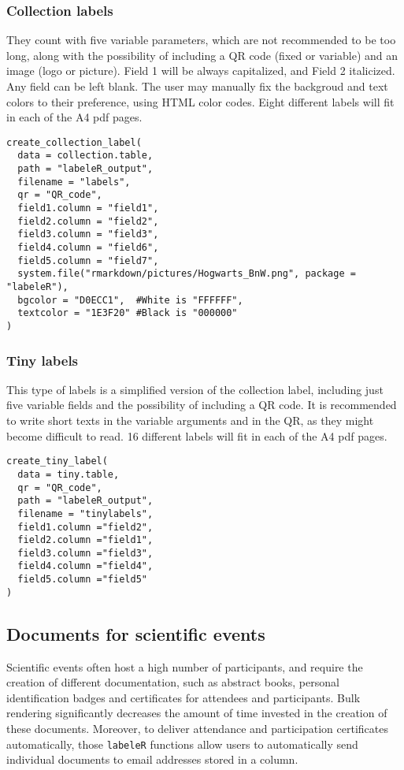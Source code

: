 \documentclass[draft,linenumbers]{agujournal2018}
\begin{document}
\subsubsection{Collection labels}

They count with five variable parameters, which are not recommended to
be too long, along with the possibility of including a QR code (fixed or
variable) and an image (logo or picture). Field 1 will be always
capitalized, and Field 2 italicized. Any field can be left blank. The
user may manually fix the backgroud and text colors to their preference,
using HTML color codes. Eight different labels will fit in each of the
A4 pdf pages.

\begin{verbatim}
create_collection_label(
  data = collection.table,
  path = "labeleR_output",
  filename = "labels",
  qr = "QR_code",
  field1.column = "field1",
  field2.column = "field2",
  field3.column = "field3",
  field4.column = "field6",
  field5.column = "field7",
  system.file("rmarkdown/pictures/Hogwarts_BnW.png", package = "labeleR"),
  bgcolor = "D0ECC1",  #White is "FFFFFF",
  textcolor = "1E3F20" #Black is "000000"
)
\end{verbatim}

\subsubsection{Tiny labels}

This type of labels is a simplified version of the collection label,
including just five variable fields and the possibility of including a
QR code. It is recommended to write short texts in the variable
arguments and in the QR, as they might become difficult to read. 16
different labels will fit in each of the A4 pdf pages.

\begin{verbatim}
create_tiny_label(
  data = tiny.table,
  qr = "QR_code",
  path = "labeleR_output",
  filename = "tinylabels",
  field1.column ="field2",
  field2.column ="field1",
  field3.column ="field3",
  field4.column ="field4",
  field5.column ="field5" 
)
\end{verbatim}

\subsection{Documents for scientific events}

Scientific events often host a high number of participants, and require
the creation of different documentation, such as abstract books,
personal identification badges and certificates for attendees and
participants. Bulk rendering significantly decreases the amount of time
invested in the creation of these documents. Moreover, to deliver
attendance and participation certificates automatically, those
\texttt{labeleR} functions allow users to automatically send individual
documents to email addresses stored in a column.
\end{document}
